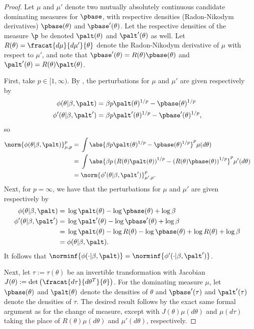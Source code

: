 \begin{proof}
%

Let $\mu$ and $\mu'$ denote two mutually absolutely continuous candidate
dominating measures for $\pbase$, with respective densities (Radon-Nikodym
derivatives) $\pbase(\theta)$ and $\pbase'(\theta)$.  Let the respective
densities of the measure $\p$ be denoted $\palt(\theta)$ and $\palt'(\theta)$ as
well.  Let $R(\theta) = \fracat{d\mu}{d\mu'}{\theta}$ denote the Radon-Nikodym
derivative of $\mu$ with respect to $\mu'$, and note that $\pbase'(\theta) =
R(\theta) \pbase(\theta)$ and $\palt'(\theta) = R(\theta) \palt(\theta)$.

First, take $p \in [1, \infty)$.  By , the perturbations
for $\mu$ and $\mu'$ are given respectively by
%
\begin{align*}
%
\phi(\theta \vert \beta, \palt) ={}&
    \beta p \palt(\theta)^{1/p} - \pbase(\theta)^{1/p}\\
\phi'(\theta \vert \beta, \palt') ={}&
    \beta p \palt'(\theta)^{1/p} - \pbase'(\theta)^{1/p},
%
\end{align*}
%
so
%
\begin{align*}
%
\norm{\phi(\theta \vert \beta, \palt)}_{\mu,p}^p ={}&
\int \abs{\beta p \palt(\theta)^{1/p} - \pbase(\theta)^{1/p}}^p
    \mu(d\theta)
%
\\={}&
\int \abs{\beta p \left(R(\theta) \palt(\theta)\right)^{1/p} -
          \left(R(\theta) \pbase(\theta)\right)^{1/p}}^p
     \mu'(d\theta)
%
\\={}&
\norm{\phi'(\theta \vert \beta, \palt')}_{\mu',p}^p.
%
\end{align*}
%
Next, for $p = \infty$, we have that the perturbations for $\mu$ and $\mu'$ are
given respectively by
%
\begin{align*}
%
\phi(\theta \vert \beta, \palt) ={}&
  \log \palt(\theta) - \log \pbase(\theta) + \log \beta \\
\phi'(\theta \vert \beta, \palt') ={}&
    \log \palt'(\theta) - \log \pbase'(\theta) + \log \beta
\\={}&
\log \palt(\theta) - \log R(\theta)
    - \log \pbase(\theta) + \log R(\theta)+ \log \beta
\\={}&
\phi(\theta \vert \beta, \palt).
%
\end{align*}
%
It follows that $\norminf{\phi(\cdot \vert \beta, \palt)} = \norminf{\phi'(\cdot
\vert \beta, \palt')}$.

Next, let $\tau := \tau(\theta)$ be an invertible transformation with Jacobian
$J(\theta) := \mathrm{det}\left(\fracat{d\tau}{d\theta^T}{\theta}\right)$. For
the dominating measure $\mu$, let $\pbase(\theta)$ and $\palt(\theta)$ denote
the densities of $\theta$ and $\pbase'(\tau)$ and $\palt'(\tau)$ denote the
densities of $\tau$.  The desired result follows by the exact same formal
argument as for the change of measure, except with $J(\theta) \mu(d\theta)$
and $\mu(d\tau)$ taking the place of $R(\theta) \mu(d\theta)$ and
$\mu'(d\theta)$, respectively.
%
\end{proof}

